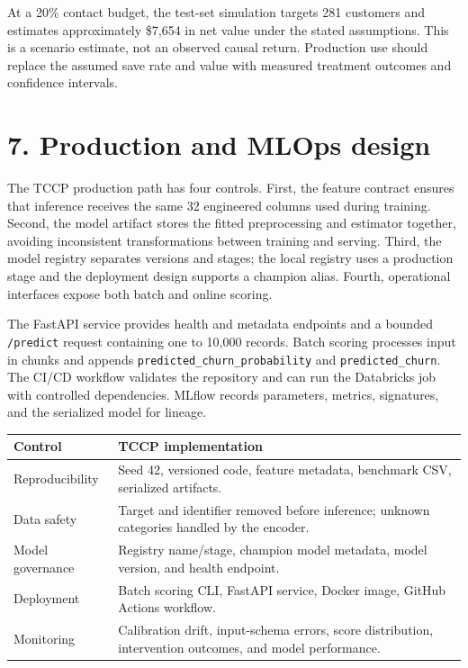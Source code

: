 \documentclass[9pt]{article}
\begin{document}
At a 20\% contact budget, the test-set simulation targets 281 customers and estimates approximately \$7,654 in net value under the stated assumptions. This is a scenario estimate, not an observed causal return. Production use should replace the assumed save rate and value with measured treatment outcomes and confidence intervals.

\section*{7. Production and MLOps design}
The TCCP production path has four controls. First, the feature contract ensures that inference receives the same 32 engineered columns used during training. Second, the model artifact stores the fitted preprocessing and estimator together, avoiding inconsistent transformations between training and serving. Third, the model registry separates versions and stages; the local registry uses a production stage and the deployment design supports a champion alias. Fourth, operational interfaces expose both batch and online scoring.

The FastAPI service provides health and metadata endpoints and a bounded \texttt{/predict} request containing one to 10,000 records. Batch scoring processes input in chunks and appends \texttt{predicted\_churn\_probability} and \texttt{predicted\_churn}. The CI/CD workflow validates the repository and can run the Databricks job with controlled dependencies. MLflow records parameters, metrics, signatures, and the serialized model for lineage.

\begin{center}
\begin{tabular}{p{}p{}}
\toprule
\textbf{Control} & \textbf{TCCP implementation}\\
\midrule
Reproducibility & Seed 42, versioned code, feature metadata, benchmark CSV, serialized artifacts.\\
Data safety & Target and identifier removed before inference; unknown categories handled by the encoder.\\
Model governance & Registry name/stage, champion model metadata, model version, and health endpoint.\\
Deployment & Batch scoring CLI, FastAPI service, Docker image, GitHub Actions workflow.\\
Monitoring & Calibration drift, input-schema errors, score distribution, intervention outcomes, and model performance.\\
\bottomrule
\end{tabular}
\end{center}
\end{document}

